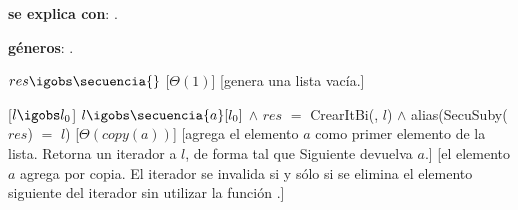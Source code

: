 
\begin{Interfaz}
  \textbf{se explica con}: .

  \textbf{géneros}: .


  {$res \igobs \secuencia{}$}%
  [$\Theta(1)$]
  [genera una lista vacía.]

  [$l \igobs l_0$]
  {$l \igobs \secuencia{a}[l_0]$ $\land$ $res$ $=$ CrearItBi(\secuencia{}, $l$) $\land$ alias(SecuSuby($res$) $=$ $l$)}
  [$\Theta(copy(a))$]
  [agrega el elemento $a$ como primer elemento de la lista.  Retorna un iterador a $l$, de forma tal que Siguiente devuelva $a$.]
  [el elemento $a$ agrega por copia. El iterador se invalida si y sólo si se elimina el elemento siguiente del iterador sin utilizar la función .]


\end{Interfaz}

